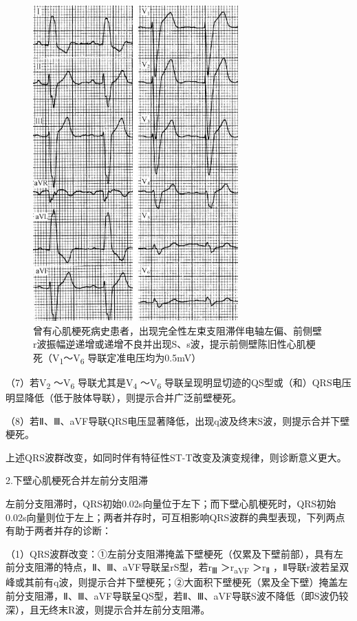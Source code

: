 \begin{figure}[!htbp]
 \centering
 \includegraphics[width=3.10417in,height=4.77083in]{./images/Image00723.jpg}
 \captionsetup{justification=centering}
 \caption{曾有心肌梗死病史患者，出现完全性左束支阻滞伴电轴左偏、前侧壁r波振幅逆递增或递增不良并出现S、s波，提示前侧壁陈旧性心肌梗死（V\textsubscript{1}～V\textsubscript{6} 导联定准电压均为0.5mV）}
 \label{fig44-15}
  \end{figure} 


（7）若V\textsubscript{2} ～V\textsubscript{6}
导联尤其是V\textsubscript{4} ～V\textsubscript{6}
导联呈现明显切迹的QS型或（和）QRS电压明显降低（低于肢体导联），则提示合并广泛前壁梗死。

（8）若Ⅱ、Ⅲ、aVF导联QRS电压显著降低，出现q波及终末S波，则提示合并下壁梗死。

上述QRS波群改变，如同时伴有特征性ST-T改变及演变规律，则诊断意义更大。

2.下壁心肌梗死合并左前分支阻滞

左前分支阻滞时，QRS初始0.02s向量位于左下；而下壁心肌梗死时，QRS初始0.02s向量则位于左上；两者并存时，可互相影响QRS波群的典型表现，下列两点有助于两者并存的诊断：

（1）QRS波群改变：①左前分支阻滞掩盖下壁梗死（仅累及下壁前部），具有左前分支阻滞的特点，Ⅱ、Ⅲ、aVF导联呈rS型，若r\textsubscript{Ⅲ}
＞r\textsubscript{aVF} ＞r\textsubscript{Ⅱ}
，Ⅱ导联r波若呈双峰或其前有q波，则提示合并下壁梗死；②大面积下壁梗死（累及全下壁）掩盖左前分支阻滞，Ⅱ、Ⅲ、aVF导联呈QS型，若Ⅱ、Ⅲ、aVF导联S波不降低（即S波仍较深），且无终末R波，则提示合并左前分支阻滞。

